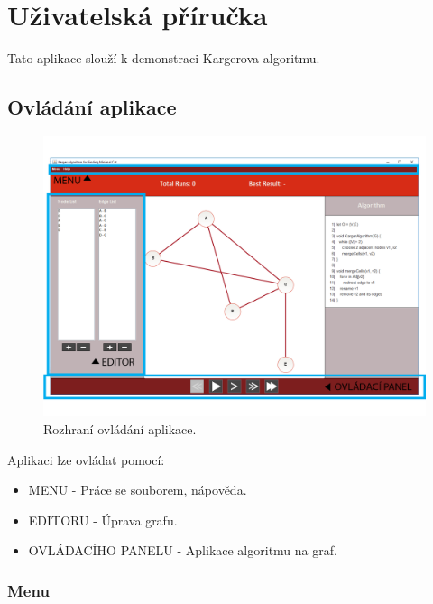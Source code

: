 \documentclass[../projekt.tex]{subfiles}
\begin{document}
\chapter{Uživatelská příručka}

Tato aplikace slouží k demonstraci Kargerova algoritmu. 

\section{Ovládání aplikace}


	\begin{figure}[ht]
    	\begin{center}
  			\includegraphics[scale=0.36]{obrazky-figures/ovladani.png}
  			\caption{Rozhraní ovládání aplikace.}
  		\end{center}
	\end{figure}
	
Aplikaci lze ovládat pomocí:
	
\begin{itemize}
	\item MENU - Práce se souborem, nápověda.
	\item EDITORU - Úprava grafu.
	\item OVLÁDACÍHO PANELU - Aplikace algoritmu na graf.
\end{itemize}




\subsection{Menu}
\end{document}
